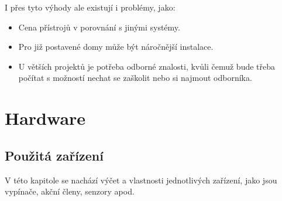 \documentclass[12pt, a4paper,
twoside,        %
openright
]{report}
\begin{document}
I přes tyto výhody ale existují i problémy, jako: 

\begin{itemize}
	\item Cena přístrojů v porovnání s jinými systémy.
	\item Pro již postavené domy může být náročnější instalace.
	\item U větších projektů je potřeba odborné znalosti, kvůli čemuž bude třeba počítat s možností nechat se zaškolit nebo si najmout odborníka.
\end{itemize}

\chapter{Hardware}

\section{Použitá zařízení}
\label{sec:hw_devices}

V této kapitole se nachází výčet a vlastnosti jednotlivých zařízení, jako jsou vypínače, akční členy, senzory apod.


\end{document}
